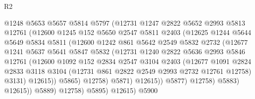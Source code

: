 \begin{lexlean}{R2}
\begin{coremodule}
                      @1248
                      @5653
                      @5657
                      @5814
                      @5797
                      (@12731
                        @1247
                        @2822
                        @5652
                        @2993
                        @5813
                        @12761
                        (@12600
                          @1245
                          @152
                          @5650
                          @2547
                          @5811
                          @2403
                          (@12625
                            @1244
                            @5644
                            @5649
                            @5834
                            @5811
                            (@12600
                              @1242
                              @861
                              @5642
                              @2549
                              @5832
                              @2732
                              (@12677
                                @1241
                                @5637
                                @5641
                                @5847
                                @5832
                                (@12731
                                  @1240
                                  @2822
                                  @5636
                                  @2993
                                  @5846
                                  @12761
                                  (@12600
                                    @1092
                                    @152
                                    @2834
                                    @2547
                                    @3104
                                    @2403
                                    (@12677
                                      @1091
                                      @2824
                                      @2833
                                      @3118
                                      @3104
                                      (@12731 @861 @2822 @2549 @2993 @2732 @12761 @12758)
                                      @3131)
                                    @12615))
                                @5865)
                              @12758)
                            @5871)
                          @12615))
                      @5877)
                    @12758)
                  @5883)
                @12615))
            @5889)
          @12758)
        @5895)
      @12615)
    @5900

\end{coremodule}
\end{lexlean}
